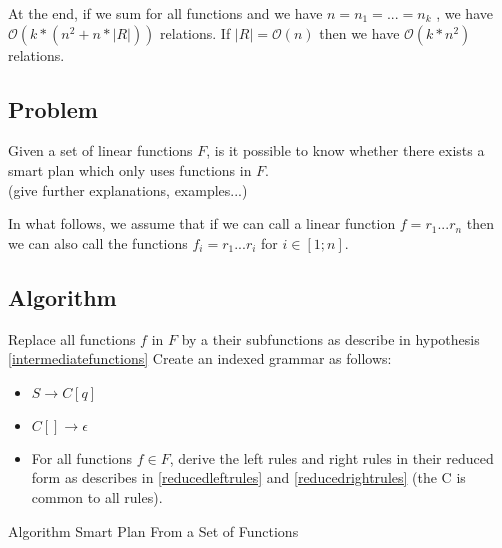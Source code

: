 \documentclass[10pt,a4paper,draft]{article}
\begin{document}
At the end, if we sum for all functions and we have $n = n_1 = ... = n_k$ , we have $\mathcal{O}(k*(n^2 + n * |R|))$ relations. If $|R| = \mathcal{O}(n)$ then we have $\mathcal{O}(k * n^2)$ relations.

\subsection{Problem}

Given a set of linear functions $F$, is it possible to know whether there exists a smart plan which only uses functions in $F$.\\
(give further explanations, examples...)

\begin{hypothesis}
\label{intermediatefunctions}
In what follows, we assume that if we can call a linear function $f = r_1 ... r_n$ then we can also call the functions $f_i = r_1 ... r_i$ for $i \in [1; n]$.

\end{hypothesis}

\subsection{Algorithm}

\begin{algorithm}[H]
\SetAlgoLined
{}
Replace all functions $f$ in $F$ by a their subfunctions as describe in hypothesis \ref{intermediatefunctions}\;
Create an indexed grammar as follows:
\begin{itemize}
\item $S \rightarrow C[q]$
\item $C[] \rightarrow \epsilon$
\item For all functions $f \in F$, derive the left rules and right rules in their reduced form as describes in \ref{reducedleftrules} and \ref{reducedrightrules} (the C is common to all rules).
 \end{itemize}
 \caption{Algorithm Smart Plan From a Set of Functions}
 \label{functionWBLAlgo}
\end{algorithm}
\end{document}
